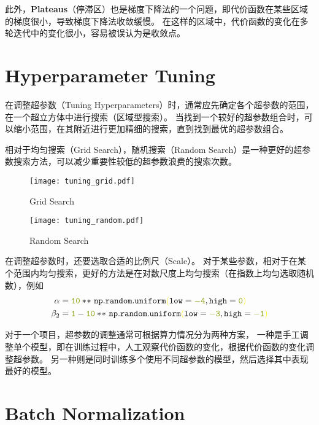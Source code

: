 此外，\textbf{Plateaus}（停滞区）也是梯度下降法的一个问题，即代价函数在某些区域的梯度很小，导致梯度下降法收敛缓慢。
在这样的区域中，代价函数的变化在多轮迭代中的变化很小，容易被误认为是收敛点。

\section{Hyperparameter Tuning}

在调整超参数（Tuning Hyperparameters）时，通常应先确定各个超参数的范围，在一个超立方体中进行搜索（区域型搜索）。
当找到一个较好的超参数组合时，可以缩小范围，在其附近进行更加精细的搜索，直到找到最优的超参数组合。

相对于均匀搜索（Grid Search），随机搜索（Random Search）是一种更好的超参数搜索方法，可以减少重要性较低的超参数浪费的搜索次数。
\begin{figure}[h!bt]
    \centering
    \begin{minipage}[t]{0.45\textwidth}
        \centering
        \texttt{[image: tuning\_grid.pdf]}
        \caption{Grid Search}
    \end{minipage}
    \begin{minipage}[t]{0.45\textwidth}
        \centering
        \texttt{[image: tuning\_random.pdf]}
        \caption{Random Search}
    \end{minipage}
\end{figure}

在调整超参数时，还要选取合适的比例尺（Scale）。
对于某些参数，相对于在某个范围内均匀搜索，更好的方法是在对数尺度上均匀搜索（在指数上均匀选取随机数），例如
\begin{align}
    \alpha &= \mathtt{\textcolor{green}{10} *\!* \ np.random.uniform\textcolor{yellow}{(}low=\textcolor{green}{-4}, high=\textcolor{green}{0}\textcolor{yellow}{)}} \\
    \beta_2 &= \mathtt{\textcolor{green}{1} - \textcolor{green}{10} *\!* \ np.random.uniform\textcolor{yellow}{(}low=\textcolor{green}{-3}, high=\textcolor{green}{-1}\textcolor{yellow}{)}}
\end{align}

对于一个项目，超参数的调整通常可根据算力情况分为两种方案，
一种是手工调整单个模型，即在训练过程中，人工观察代价函数的变化，根据代价函数的变化调整超参数。
另一种则是同时训练多个使用不同超参数的模型，然后选择其中表现最好的模型。

\section{Batch Normalization}

